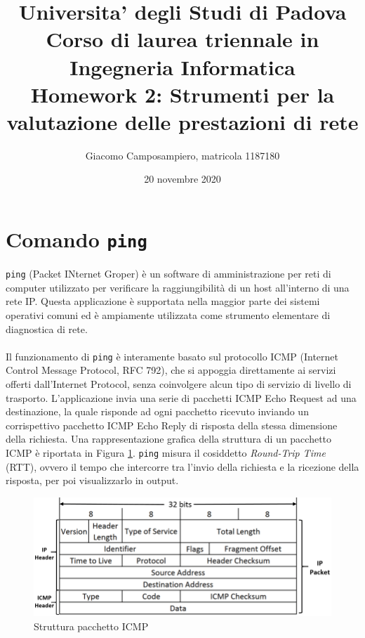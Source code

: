 \documentclass[a4paper,10pt]{article}
\begin{document}
   \title{{\large Universita' degli Studi di Padova \\ } {\normalsize Corso di laurea triennale in Ingegneria Informatica}\\ \vspace{1.8cm} \textbf{ Homework 2: Strumenti per la valutazione delle prestazioni di rete}}
   
   \author{Giacomo Camposampiero, matricola 1187180} 
   \date{20 novembre 2020}
   \maketitle
   \vspace{9.2cm}
   \renewcommand{\contentsname}{Indice}      
   \tableofcontents
   \newpage

\section{Comando \texttt{ping} }
\texttt{ping} (Packet INternet Groper) è un software di amministrazione per reti di computer utilizzato per verificare la raggiungibilità di un host all'interno di una rete IP. Questa applicazione è supportata nella maggior parte dei sistemi operativi comuni ed è ampiamente utilizzata come strumento elementare di diagnostica di rete. \\\\
Il funzionamento di \texttt{ping} è interamente basato sul protocollo ICMP (Internet Control Message Protocol, RFC 792), che si appoggia direttamente ai servizi offerti dall'Internet Protocol, senza coinvolgere alcun tipo di servizio di livello di trasporto. L'applicazione invia una serie di pacchetti ICMP Echo Request ad una destinazione, la quale risponde ad ogni pacchetto ricevuto inviando un corrispettivo pacchetto ICMP Echo Reply di risposta della stessa dimensione della richiesta. Una rappresentazione grafica della struttura di un pacchetto ICMP è riportata in Figura \ref{fig:ICMP}. \texttt{ping} misura il cosiddetto \textit{Round-Trip Time} (RTT), ovvero il tempo che intercorre tra l'invio della richiesta e la ricezione della risposta, per poi visualizzarlo in output.

\begin{figure}[h!]
	\centering
	\includegraphics[scale=0.25]{img/icmp.png}
  	\caption{Struttura pacchetto ICMP \cite{ref:icmp}}
  	\label{fig:ICMP}
\end{figure}
\end{document}

